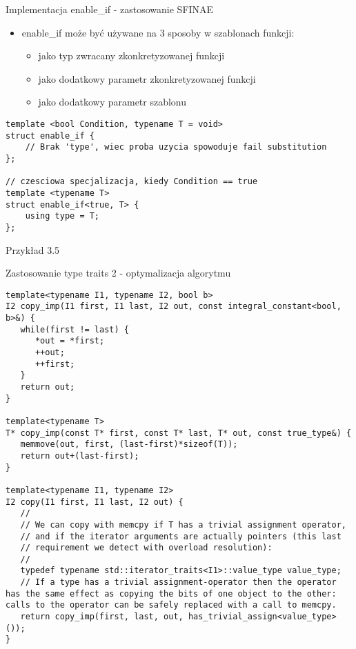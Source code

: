 \documentclass[11pt]{beamer}
\begin{document}
\begin{frame}[fragile]{Implementacja enable\_if - zastosowanie SFINAE}
    \begin{itemize}
        \item enable\_if może być używane na 3 sposoby w szablonach funkcji:
        \begin{itemize}
            \item jako typ zwracany zkonkretyzowanej funkcji
            \item jako dodatkowy parametr zkonkretyzowanej funkcji
            \item jako dodatkowy parametr szablonu
        \end{itemize} 
    \end{itemize}


    \begin{lstlisting}[frame=single,basicstyle=\tiny]
template <bool Condition, typename T = void>
struct enable_if {
    // Brak 'type', wiec proba uzycia spowoduje fail substitution
};

// czesciowa specjalizacja, kiedy Condition == true
template <typename T>
struct enable_if<true, T> {
    using type = T;
};
    \end{lstlisting}

    \alert{Przykład 3.5}
\end{frame}

\begin{frame}[fragile]{Zastosowanie type traits 2 - optymalizacja algorytmu}
 \begin{lstlisting}[frame=single,basicstyle=\tiny]
template<typename I1, typename I2, bool b>
I2 copy_imp(I1 first, I1 last, I2 out, const integral_constant<bool, b>&) {
   while(first != last) {
      *out = *first;
      ++out;
      ++first;
   }
   return out;
}

template<typename T>
T* copy_imp(const T* first, const T* last, T* out, const true_type&) {
   memmove(out, first, (last-first)*sizeof(T));
   return out+(last-first);
}

template<typename I1, typename I2>
I2 copy(I1 first, I1 last, I2 out) {
   //
   // We can copy with memcpy if T has a trivial assignment operator,
   // and if the iterator arguments are actually pointers (this last
   // requirement we detect with overload resolution):
   //
   typedef typename std::iterator_traits<I1>::value_type value_type;
   // If a type has a trivial assignment-operator then the operator has the same effect as copying the bits of one object to the other: calls to the operator can be safely replaced with a call to memcpy.
   return copy_imp(first, last, out, has_trivial_assign<value_type>());
}
    \end{lstlisting}
\end{frame}
\end{document}
